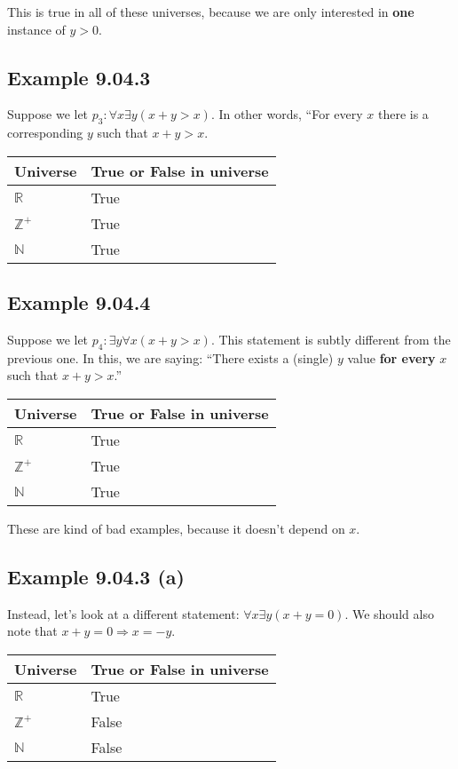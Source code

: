 \documentclass{article}
\begin{document}
This is true in all of these universes, because we are only interested
in \textbf{one} instance of $y>0$.

\subsection*{Example 9.04.3}

Suppose we let $p_3:\forall{}x\exists{}y(x+y>x)$. In other words, ``For
every $x$ there is a corresponding $y$ such that $x+y>x$.

\begin{tabular}{ll}
Universe & True or False in universe \\
\hline
$\mathbb{R}$ & True \\
$\mathbb{Z}^+$ & True \\
$\mathbb{N}$ & True \\
\end{tabular}

\subsection*{Example 9.04.4}

Suppose we let $p_4:\exists{}y\forall{}x(x+y>x)$. This statement is
subtly different from the previous one. In this, we are saying:
``There exists a (single) $y$ value \textbf{for every} $x$ such that
$x+y>x$.''

\begin{tabular}{ll}
Universe & True or False in universe \\
\hline
$\mathbb{R}$ & True \\
$\mathbb{Z}^+$ & True \\
$\mathbb{N}$ & True \\
\end{tabular}

These are kind of bad examples, because it doesn't depend on $x$.

\subsection*{Example 9.04.3 (a)}

Instead, let's look at a different statement:
$\forall{}x\exists{}y(x+y=0)$. We should also note that
$x+y=0\Rightarrow{}x=-y$.

\begin{tabular}{ll}
Universe & True or False in universe \\
\hline
$\mathbb{R}$ & True \\
$\mathbb{Z}^+$ & False \\
$\mathbb{N}$ & False \\
\end{tabular}
\end{document}
